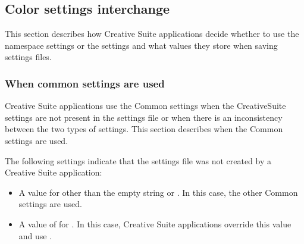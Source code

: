 \documentclass[letterpaper,12pt,english,openany,oneside]{sphinxmanual}
\begin{document}
\subsection{Color settings interchange}
\label{\detokenize{PDF_Create_UsingSettings:color-settings-interchange}}
This section describes how Creative Suite applications decide whether to use the  namespace settings or the  settings and what values they store when saving settings files.


\subsubsection{When common settings are used}
\label{\detokenize{PDF_Create_UsingSettings:when-common-settings-are-used}}
Creative Suite applications use the Common settings when the CreativeSuite settings are not present in the settings file or when there is an inconsistency between the two types of settings. This section describes when the Common settings are used.

The following settings indicate that the settings file was not created by a Creative Suite application:
\begin{itemize}
\item {} 
A value for  other than the empty string or  . In this case, the other Common settings are used.

\item {} 
A value of  for  . In this case, Creative Suite applications override this value and use  .

\end{itemize}
\end{document}
